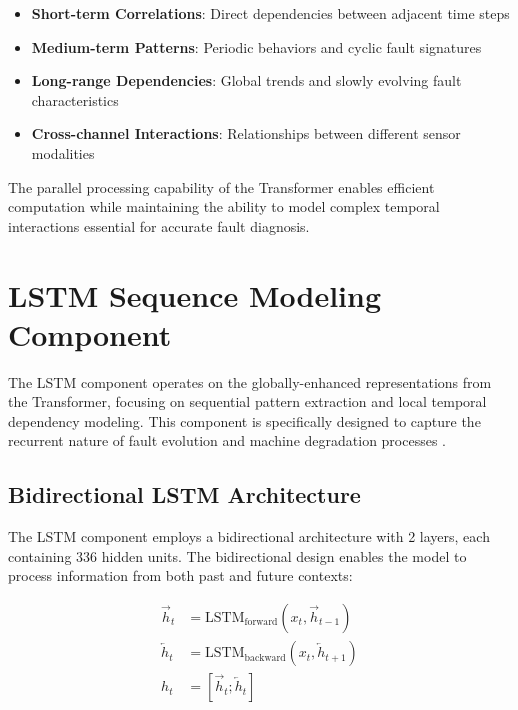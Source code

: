 \begin{itemize}
    \item \textbf{Short-term Correlations}: Direct dependencies between adjacent time steps
    \item \textbf{Medium-term Patterns}: Periodic behaviors and cyclic fault signatures  
    \item \textbf{Long-range Dependencies}: Global trends and slowly evolving fault characteristics
    \item \textbf{Cross-channel Interactions}: Relationships between different sensor modalities
\end{itemize}

The parallel processing capability of the Transformer enables efficient computation while maintaining the ability to model complex temporal interactions essential for accurate fault diagnosis.

\section{LSTM Sequence Modeling Component}
\label{sec:hybrid_model:lstm_component}

The LSTM component operates on the globally-enhanced representations from the Transformer, focusing on sequential pattern extraction and local temporal dependency modeling. This component is specifically designed to capture the recurrent nature of fault evolution and machine degradation processes \citep{hochreiter1997long, filonov2016multivariateindustrialtimeseries}.

\subsection{Bidirectional LSTM Architecture}
\label{subsec:bilstm_architecture}

The LSTM component employs a bidirectional architecture with 2 layers, each containing 336 hidden units. The bidirectional design enables the model to process information from both past and future contexts:

\begin{align}
\overrightarrow{h}_t &= \text{LSTM}_{\text{forward}}(x_t, \overrightarrow{h}_{t-1}) \\
\overleftarrow{h}_t &= \text{LSTM}_{\text{backward}}(x_t, \overleftarrow{h}_{t+1}) \\
h_t &= [\overrightarrow{h}_t; \overleftarrow{h}_t]
\end{align}

